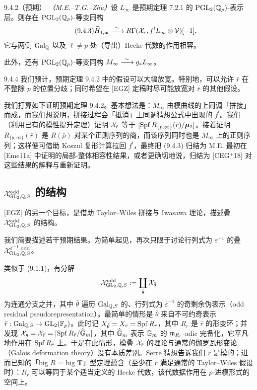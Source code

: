 
\begin{thm}{9.4.2（预期）}\label{thm:a4-16-9-4-2}
\textit{（M.E.--T.G.--Zhu）}设 $L_\infty$ 是预期定理 7.2.1 的 $\mathrm{PGL}_2(\mathbb{Q}_p)$-表示层。则存在 $\mathrm{PGL}_2(\mathbb{Q}_p)$-等变同构
\begin{equation}\tag{9.4.3}\label{eq:a4-16-9-4-3}
\widetilde H_{1,\mathfrak{m}}\xrightarrow{\ \sim\ } R\Gamma(\mathcal{X}_{\bar r},f^{!}L_\infty\otimes\mathcal V)[-1],
\end{equation}
它与两侧 $\operatorname{Gal}_{\mathbb{Q}}$ 以及 $\ell\neq p$ 处（导出）Hecke 代数的作用相容。

此外，还有 $\mathrm{PGL}_2(\mathbb{Q}_p)$-等变同构 $M_\infty\xrightarrow{\ \sim\ } g_*L_\infty$。
\end{thm}

\begin{rem}{9.4.4}\label{rem:a4-16-9-4-4}
我们预计，预期定理 9.4.2 中的假设可以大幅放宽。特别地，可以允许 $\bar r$ 在不整除 $p$ 的位置分歧；同时希望在 [EGZ] 定稿时尽可能放宽对 $\bar r$ 的其他假设。
\end{rem}

我们打算如下证明预期定理 9.4.2。基本想法是：$M_\infty$ 由模曲线的上同调「拼接」而成，而我们想说明，拼接过程会「抵消」上同调猜想公式中出现的 $f^{!}$。我们（利用已有的模性提升定理）证明 $\mathcal{X}_{\bar r}$ 等于 $[\operatorname{Spf} R_{\{p,\infty\}}(\bar r)/\boldsymbol{\mu}_2]$。接着证明 $R_{\{p,\infty\}}(\bar r)$ 是 $R(\bar\rho)$ 对某个正则序列的商，而该序列同时也是 $M_\infty$ 上的正则序列；这样便可借助 Koszul 复形计算拉回 $f^{!}$，最终把 (9.4.3) 归结为 M.E. 最初在 [Eme11a] 中证明的局部-整体相容性结果，或者更确切地说，归结为 [CEG$^+$18] 对这些结果的解释与重新证明。

\subsection{$\mathcal{X}^{\mathrm{odd}}_{\mathrm{GL}_2,\mathbb{Q},S}$ 的结构}

[EGZ] 的另一个目标，是借助 Taylor--Wiles 拼接与 Iwasawa 理论，描述叠 $\mathcal{X}^{\mathrm{odd}}_{\mathrm{GL}_2,\mathbb{Q},S}$ 的结构。

我们简要描述若干预期结果。为简单起见，再次只限于讨论行列式为 $\varepsilon^{-1}$ 的叠 $\mathcal{X}^{\varepsilon^{-1},\mathrm{odd}}_{\mathrm{GL}_2,\mathbb{Q},S}$。

类似于 (9.1.1)，有分解
\[
\mathcal{X}^{\mathrm{odd}}_{\mathrm{GL}_2,\mathbb{Q},S}:=\coprod_{\bar\theta}\mathcal{X}_{\bar\theta}
\]
为连通分支之并，其中 $\bar\theta$ 遍历 $\operatorname{Gal}_{\mathbb{Q},S}$ 的、行列式为 $\bar\varepsilon^{-1}$ 的奇剩余伪表示（odd residual pseudorepresentation）。最简单的情形是 $\bar\theta$ 来自不可约奇表示 $\bar r:\operatorname{Gal}_{\mathbb{Q},S}\to\mathrm{GL}_2(\mathbb{F}_p)$。此时记 $X_{\bar\theta}=X_{\bar r}=\operatorname{Spf} R_{\bar r}$，其中 $R_{\bar r}$ 是 $\bar r$ 的形变环；并发现 $\mathcal{X}_{\bar\theta}=\mathcal{X}_{\bar r}=[\operatorname{Spf} R_{\bar r}/\widehat{\mathbb{G}}_m]$，其中 $\widehat{\mathbb{G}}_m$ 表示 $\mathbb{G}_m$ 的 $\mathfrak{m}_{R_{\bar r}}$-adic 完备化，它平凡地作用在 $\operatorname{Spf} R_{\bar r}$ 上。于是在此情形，模叠 $\mathcal{X}_{\bar r}$ 的理论与通常的伽罗瓦形变论（Galois deformation theory）没有本质差别。Serre 猜想告诉我们 $\bar r$ 是模的；进而已知的「big $R$ = big $\mathbf T$」型定理蕴含（至少在 $\bar r$ 满足通常的 Taylor--Wiles 假设时）：$R_{\bar r}$ 可以等同于某个适当定义的 Hecke 代数，该代数据作用在 $p$-进模形式的空间上。

